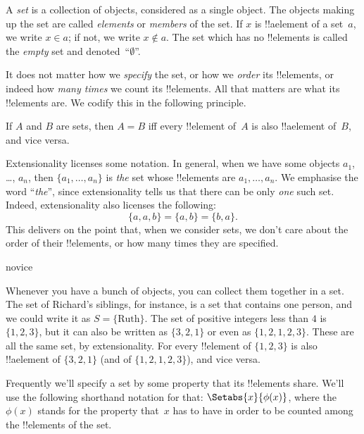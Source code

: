 \documentclass[../../../include/open-logic-section]{subfiles}
\begin{document}

A \emph{set} is a collection of objects, considered {as} a single
object. The objects making up the set are called \emph{elements} or
\emph{members} of the set. If $x$ is !!a{element} of a set~$a$, we
write $x \in a$; if not, we write $x \notin a$. The set which has no
!!{element}s is called the \emph{empty} set and
denoted~``$\emptyset$''.

\begin{explain}
It does not matter how we \emph{specify} the set, or how we
\emph{order} its !!{element}s, or indeed how \emph{many times} we
count its !!{element}s. All that matters are what its !!{element}s
are. We codify this in the following principle.
\end{explain}

\begin{defn}[Extensionality]
  If $A$ and $B$ are sets, then $A = B$ iff
  every !!{element} of~$A$ is also !!a{element} of~$B$, and vice
  versa.
\end{defn}

Extensionality licenses some notation. In general, when we have some
objects $a_{1}$, \dots, $a_{n}$, then $\{a_{1}, \dots, a_{n}\}$ is
\emph{the} set whose !!{element}s are $a_1, \ldots, a_n$. We emphasise
the word ``\emph{the}'', since extensionality tells us that there can
be only \emph{one} such set. Indeed, extensionality also licenses the
following:
  \[
    \{a, a, b\} = \{a, b\} = \{b,a\}.
  \] 
This delivers on the point that, when we consider sets, we don't care
about the order of their !!{element}s, or how many times they are
specified.

\begin{tagblock}{novice}
\begin{ex}
Whenever you have a bunch of objects, you can collect them together in
a set. The set of Richard's siblings, for instance, is a set that
contains one person, and we could write it as $S=\{\textrm{Ruth}\}$.
The set of positive integers less than $4$ is $\{1, 2, 3\}$, but it
can also be written as $\{3, 2, 1\}$ or even as $\{1, 2, 1, 2, 3\}$.
These are all the same set, by extensionality. For every !!{element}
of $\{1, 2, 3\}$ is also !!a{element} of $\{3, 2, 1\}$ (and of $\{1,
2, 1, 2, 3\}$), and vice versa.
\end{ex} 
\end{tagblock}

Frequently we'll specify a set by some property that its !!{element}s
share. We'll use the following shorthand notation for that:
$\Setabs{x}{\phi(x)}$, where the $\phi(x)$ stands for the property
that~$x$ has to have in order to be counted among the !!{element}s of
the set. 
\end{document}
